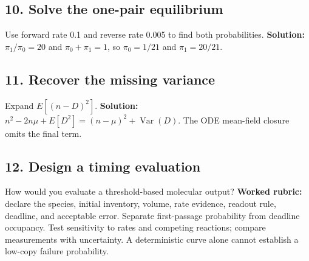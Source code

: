 \subsection*{10. Solve the one-pair equilibrium}
Use forward rate 0.1 and reverse rate 0.005 to find both probabilities.
\textbf{Solution:} $\pi_1/\pi_0=20$ and $\pi_0+\pi_1=1$,
so $\pi_0=1/21$ and $\pi_1=20/21$.

\subsection*{11. Recover the missing variance}
Expand $E[(n-D)^2]$.
\textbf{Solution:} $n^2-2n\mu+E[D^2]=(n-\mu)^2+\operatorname{Var}(D)$.
The ODE mean-field closure omits the final term.

\subsection*{12. Design a timing evaluation}
How would you evaluate a threshold-based molecular output?
\textbf{Worked rubric:} declare the species, initial inventory, volume,
rate evidence, readout rule, deadline, and acceptable error. Separate
first-passage probability from deadline occupancy. Test sensitivity to
rates and competing reactions; compare measurements with uncertainty.
A deterministic curve alone cannot establish a low-copy failure probability.
